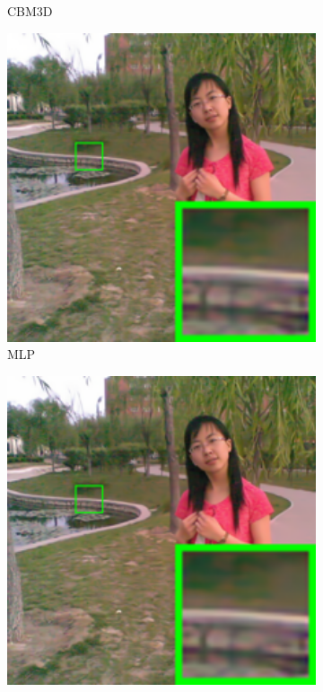 \begin{figure}
\begin{subfigure}[t]{0.19\textwidth}
		\caption{CBM3D}
    \end{subfigure}
    \hfill
    \begin{subfigure}[t]{0.19\textwidth}
        \centering
        \includegraphics[width=1\textwidth]{images/mcwnnm/nc/resize_br_MLP_chinesegirl.png}
\caption{MLP}
    \end{subfigure}
    \hfill
    \begin{subfigure}[t]{0.19\textwidth}
        \centering
        \includegraphics[width=1\textwidth]{images/mcwnnm/nc/resize_br_TNRD_chinesegirl.png}

\end{subfigure}
\end{figure}
